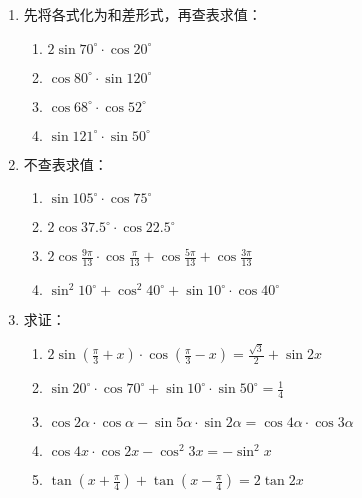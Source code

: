 \begin{ex}
\begin{enumerate}
    \item 先将各式化为和差形式，再查表求值：
    \begin{multicols}{2}
\begin{enumerate}
    \item $2\sin70^{\circ}\cdot \cos20^{\circ}$
    \item $\cos80^{\circ}\cdot \sin120^{\circ}$
    \item $\cos68^{\circ}\cdot \cos52^{\circ}$
    \item $\sin121^{\circ}\cdot \sin50^{\circ}$
\end{enumerate}          
    \end{multicols}

    
    \item 不查表求值：
    \begin{enumerate}
        \item $\sin105^{\circ}\cdot \cos75^{\circ}$
        \item $2\cos37.5^{\circ}\cdot \cos22.5^{\circ}$
        \item $2\cos\frac{9\pi}{13}\cdot \cos\frac{\pi}{13}+\cos\frac{5\pi}{13}+\cos\frac{3\pi}{13}$
        \item $\sin^2 10^{\circ}+\cos^2 40^{\circ}+\sin 10^{\circ}\cdot \cos40^{\circ}$
    \end{enumerate} 
    
    \item 求证：
    \begin{enumerate}
        \item $2\sin\left(\frac{\pi}{3}+x\right)\cdot \cos\left(\frac{\pi}{3}-x\right)=\frac{\sqrt{3}}{2}+\sin 2x$
        \item $\sin20^{\circ}\cdot \cos70^{\circ}+\sin10^{\circ}\cdot \sin50^{\circ}=\frac{1}{4}$
        \item $\cos2\alpha\cdot \cos\alpha-\sin5\alpha\cdot \sin2\alpha=\cos4\alpha\cdot \cos3\alpha$
        \item $\cos4x\cdot \cos2x-\cos^2 3x=-\sin^2 x$
        \item $\tan\left(x+\frac{\pi}{4}\right)+\tan\left(x-\frac{\pi}{4}\right)=2\tan 2x$
    \end{enumerate} 
\end{enumerate}  
\end{ex}

